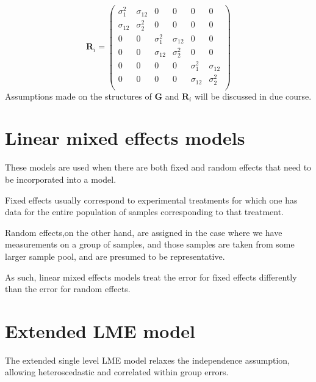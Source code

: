 \documentclass[MAIN.tex]{subfiles}
\begin{document}
\[
\boldsymbol{R}_i = \left(
\begin{array}{cccccc}
\sigma^2_{1} & \sigma_{12} & 0 & 0 & 0 & 0 \\
\sigma_{12} & \sigma^2_{2} & 0 & 0 & 0 & 0 \\
0 & 0 & \sigma^2_{1} & \sigma_{12} & 0 & 0 \\
0 & 0 & \sigma_{12} & \sigma^2_{2} & 0 & 0 \\
0 & 0 & 0 & 0 & \sigma^2_{1} & \sigma_{12} \\
0 & 0 & 0 & 0 & \sigma_{12} & \sigma^2_{2} \\
\end{array} \right)
\]
Assumptions made on the structures of $\boldsymbol{G}$ and $\boldsymbol{R}_i$ will be discussed in due course.















\newpage

\section{Linear mixed effects models}

These models are used when there are both fixed and random effects that need to be incorporated into a model.

Fixed effects usually correspond to experimental treatments for which one has data for the entire population of samples corresponding to that treatment.

Random effects,on the other hand, are assigned in the case where we have measurements on a group of samples, and those
samples are taken from some larger sample pool, and are presumed to be representative.

As such, linear mixed effects models treat the error for fixed effects differently than the error for random effects.





\section{Extended LME model}
The extended single level LME model relaxes the independence assumption, allowing heteroscedastic and correlated within group errors.
\end{document}

